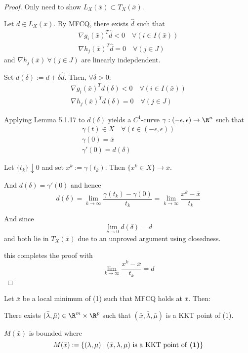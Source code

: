 \begin{proof}
	Only need to show $L_X(\bar x)\subset T_X(\bar x)$.

	Let $d\in L_X(\bar x)$. By MFCQ, there exists $\hat d$ such that
	\begin{gather*}
		\nabla g_i(\bar x)^T\hat d<0\quad\forall(i\in I(\bar x)) \\
		\nabla h_j(\bar x)^T\hat d=0\quad\forall(j\in J)
	\end{gather*}
	and $\nabla h_j(\bar x)\ \forall(j\in J)$ are linearly indepdendent.

	Set $d(\delta):= d + \delta\hat d$. Then, $\forall\delta>0$:
	\begin{gather*}
		\nabla g_i(\bar x)^T{d(\delta)}<0\quad\forall(i\in I(\bar x)) \\
		\nabla h_j(\bar x)^T{d(\delta)}=0\quad\forall(j\in J)
	\end{gather*}

	Applying Lemma 5.1.17 to $d(\delta)$ yields a $C^1$-curve
	$\gamma:(-\epsilon,\epsilon)\to\R^n$ such that
	\begin{gather*}
		\gamma(t) \in X\quad\forall(t\in(-\epsilon,\epsilon)) \\
		\gamma(0) = \bar x \\
		\gamma'(0)=d(\delta)
	\end{gather*}

	Let $\{t_k\}\downarrow0$ and set $x^k:=\gamma(t_k)$. Then
	$\{x^k\in X\}\to\bar x$.

	And $d(\delta)=\gamma'(0)$ and hence
	$$
		d(\delta)=\lim_{k\to\infty}\frac{\gamma(t_k)-\gamma(0)}{t_k}=
		\lim_{k\to\infty}\frac{x^k-\bar x}{t_k}
	$$

	And since
	$$
		\lim_{\delta\to0} d(\delta) = d
	$$
	and both lie in $T_X(\bar x)$ due to an unproved argument using
	closedness.

	this completes the proof with
	$$
		\lim_{k\to\infty}\frac{x^k-\bar x}{t_k}=d
	$$
\end{proof}

\label{b39f0fe}

Let $\bar x$ be a local minimum of (1) such that MFCQ holds at $\bar x$. Then:

\begin{enumerata}
	\item There exists $(\bar\lambda, \bar\mu)\in\R^m\times\R^p$  such
	      that $(\bar x,\bar\lambda, \bar\mu)$ is a KKT point of (1).
	\item $M(\bar x)$ is bounded where
	      $$
		      M(\bar x):=\{(\lambda,\mu)\mid(\bar x,\lambda,\mu)\text{ is a KKT point of \textbf{(1)}} \}
	      $$
\end{enumerata}

